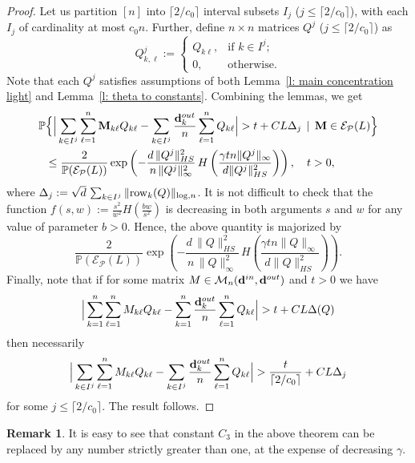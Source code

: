 \documentclass[12pt]{article}
\theoremstyle{definition}
\newtheorem{Remark}[theorem]{Remark}
\theoremstyle{plain}
\newcommand{\Event}{\mathcal{E}}
\def\ranmtx{{\bf{}M}}
\def\Prob{{\mathbb P}}
\def\InDeg{{\bf d}^{in}}
\def\OutDeg{{\bf d}^{out}}
\def\MatrixSet{{\mathcal M}_n}
\def\Row{{\rm row}}
\def\pvector{{\mathcal P}}
\begin{document}
\begin{proof}
Let us partition $[n]$ into $\lceil 2/c_0\rceil$ interval subsets $I_j$ ($j\leq \lceil 2/c_0\rceil$),
with each $I_j$ of cardinality at most $c_0n$. Further, define $n\times n$ matrices $Q^j$ ($j\leq \lceil 2/c_0\rceil$) as
$$Q^j_{k,\ell}:=\begin{cases}Q_{k\ell},&\mbox{if }k\in I^j;\\ 0,&\mbox{otherwise.}\end{cases}$$
Note that each $Q^j$ satisfies assumptions of both Lemma~\ref{l: main concentration light} and
Lemma~\ref{l: theta to constants}. Combining the lemmas, we get
\begin{align*}
\Prob&\Big\{\Big|\sum_{k\in I^j}\sum_{\ell=1}^n
{\ranmtx}_{k\ell}Q_{k\ell}-\sum_{k\in I^j}\frac{\OutDeg_{k}}{n}\sum_{\ell=1}^n Q_{k\ell}\Big|
>t+C L\Delta_j\,\mid\,{\ranmtx}\in\Event_{\pvector}(L)
\Big\}\\
&\leq \frac{2}{\Prob(\Event_\pvector(L))}\exp\left(-\frac{d\,\|Q^j\|_{HS}^2}{n\,\|Q^j\|_\infty^2}
\, H\left(\frac{\gamma tn\|Q^j\|_\infty}{d\|Q^j\|_{HS}^2}\right)\right),\quad t>0,
\end{align*}
where $\Delta_j:=\sqrt{d}\,\sum_{k\in I^j}\|\Row_k(Q)\|_{\log,n}$.
It is not difficult to check that the function
$f(s,w):=\frac{s^2}{w^2}H(\frac{bw}{s^2})$ is decreasing in both arguments $s$ and $w$ for any value of parameter $b>0$.
Hence, the above quantity is majorized by
$$
\frac{2}{\Prob(\Event_\pvector(L))}\exp\left(-\frac{d\,\|Q\|_{HS}^2}{n\,\|Q\|_\infty^2}
\, H\left(\frac{\gamma tn\|Q\|_\infty}{d\|Q\|_{HS}^2}\right)\right).
$$
Finally, note that if for some matrix $M\in\MatrixSet(\InDeg,\OutDeg)$ and $t>0$
we have
$$\Big|\sum_{k=1}^n\sum_{\ell=1}^n
{M}_{k\ell}Q_{k\ell}-\sum_{k=1}^n\frac{\OutDeg_{k}}{n}\sum_{\ell=1}^n Q_{k\ell}\Big|
>t+C L\Delta(Q)$$
then necessarily
$$\Big|\sum_{k\in I^j}\sum_{\ell=1}^n
{M}_{k\ell}Q_{k\ell}-\sum_{k\in I^j}\frac{\OutDeg_{k}}{n}\sum_{\ell=1}^n Q_{k\ell}\Big|
>\frac{t}{\lceil 2/c_0\rceil}+C L\Delta_j$$
for some $j\leq \lceil 2/c_0\rceil$.
The result follows.
\end{proof}

\begin{Remark}\label{rem: concentration constant}
It is easy to see that constant $C_3$ in the above theorem can be replaced by any number strictly
greater than one, at the expense of decreasing $\gamma$.
\end{Remark}
\end{document}
